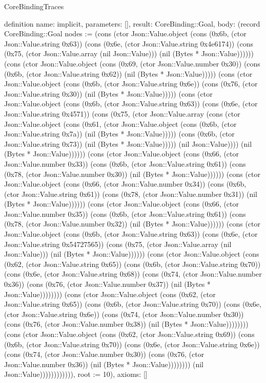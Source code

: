\begin{lexlean}{CoreBindingTraces}
\begin{semanticmodule}
definition{
 name: implicit,
 parameters: [],
 result: CoreBinding::Goal,
 body: (record CoreBinding::Goal {nodes := (cons (ctor Json::Value.object (cons (0x6b, (ctor Json::Value.string 0x63)) (cons (0x6e, (ctor Json::Value.string 0x4e6174)) (cons (0x75, (ctor Json::Value.array (nil Json::Value))) (nil (Bytes * Json::Value)))))) (cons (ctor Json::Value.object (cons (0x69, (ctor Json::Value.number 0x30)) (cons (0x6b, (ctor Json::Value.string 0x62)) (nil (Bytes * Json::Value))))) (cons (ctor Json::Value.object (cons (0x6b, (ctor Json::Value.string 0x6e)) (cons (0x76, (ctor Json::Value.string 0x30)) (nil (Bytes * Json::Value))))) (cons (ctor Json::Value.object (cons (0x6b, (ctor Json::Value.string 0x63)) (cons (0x6e, (ctor Json::Value.string 0x4571)) (cons (0x75, (ctor Json::Value.array (cons (ctor Json::Value.object (cons (0x61, (ctor Json::Value.object (cons (0x6b, (ctor Json::Value.string 0x7a)) (nil (Bytes * Json::Value))))) (cons (0x6b, (ctor Json::Value.string 0x73)) (nil (Bytes * Json::Value))))) (nil Json::Value)))) (nil (Bytes * Json::Value)))))) (cons (ctor Json::Value.object (cons (0x66, (ctor Json::Value.number 0x33)) (cons (0x6b, (ctor Json::Value.string 0x61)) (cons (0x78, (ctor Json::Value.number 0x30)) (nil (Bytes * Json::Value)))))) (cons (ctor Json::Value.object (cons (0x66, (ctor Json::Value.number 0x34)) (cons (0x6b, (ctor Json::Value.string 0x61)) (cons (0x78, (ctor Json::Value.number 0x31)) (nil (Bytes * Json::Value)))))) (cons (ctor Json::Value.object (cons (0x66, (ctor Json::Value.number 0x35)) (cons (0x6b, (ctor Json::Value.string 0x61)) (cons (0x78, (ctor Json::Value.number 0x32)) (nil (Bytes * Json::Value)))))) (cons (ctor Json::Value.object (cons (0x6b, (ctor Json::Value.string 0x63)) (cons (0x6e, (ctor Json::Value.string 0x54727565)) (cons (0x75, (ctor Json::Value.array (nil Json::Value))) (nil (Bytes * Json::Value)))))) (cons (ctor Json::Value.object (cons (0x62, (ctor Json::Value.string 0x65)) (cons (0x6b, (ctor Json::Value.string 0x70)) (cons (0x6e, (ctor Json::Value.string 0x68)) (cons (0x74, (ctor Json::Value.number 0x36)) (cons (0x76, (ctor Json::Value.number 0x37)) (nil (Bytes * Json::Value)))))))) (cons (ctor Json::Value.object (cons (0x62, (ctor Json::Value.string 0x65)) (cons (0x6b, (ctor Json::Value.string 0x70)) (cons (0x6e, (ctor Json::Value.string 0x6e)) (cons (0x74, (ctor Json::Value.number 0x30)) (cons (0x76, (ctor Json::Value.number 0x38)) (nil (Bytes * Json::Value)))))))) (cons (ctor Json::Value.object (cons (0x62, (ctor Json::Value.string 0x69)) (cons (0x6b, (ctor Json::Value.string 0x70)) (cons (0x6e, (ctor Json::Value.string 0x6e)) (cons (0x74, (ctor Json::Value.number 0x30)) (cons (0x76, (ctor Json::Value.number 0x36)) (nil (Bytes * Json::Value)))))))) (nil Json::Value)))))))))))), root := 10}),
 axioms: []
}


\end{semanticmodule}
\end{lexlean}
